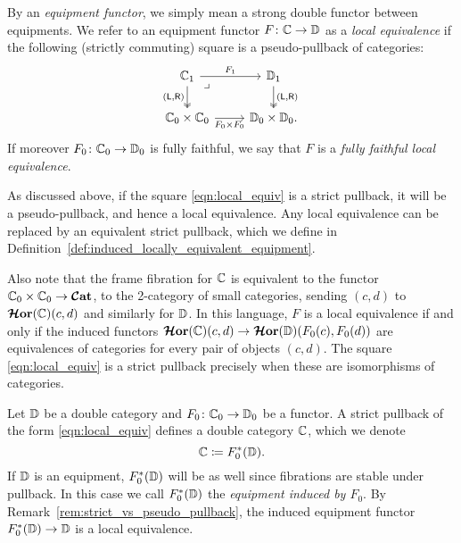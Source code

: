 \documentclass[11pt,oneside,article]{memoir}
\begin{document}
\begin{definition}
      \label{def:local_equivalence}
   By an \emph{equipment functor}, we simply mean a strong double functor between equipments. We refer to an equipment functor $F\colon\mathbb{C}\to\mathbb{D}$ as a \emph{local equivalence} if the following (strictly commuting) square is a pseudo-pullback of categories:
   \begin{equation} \begin{tikzcd}
         \label{eqn:local_equiv}
      \dcat{C}_1 \ar[r,"F_1"] \ar[d,two heads,"{(\lframe,\rframe)}"'] \ar[dr,phantom,"\lrcorner" very near start]
         & \dcat{D}_1 \ar[d,two heads,"{(\lframe,\rframe)}"] \\
      \dcat{C}_0\times\dcat{C}_0 \ar[r,"F_0\times F_0"']
         & \dcat{D}_0\times\dcat{D}_0.
   \end{tikzcd} \end{equation}
   If moreover $F_0\colon\mathbb{C}_0\to\mathbb{D}_0$ is fully faithful, we say that $F$ is a \emph{fully faithful local equivalence}.
\end{definition}

\begin{remark}
      \label{rem:strict_vs_pseudo_pullback}
   As discussed above, if the square \eqref{eqn:local_equiv} is a strict pullback, it will be a pseudo-pullback, and hence a local equivalence. Any local equivalence can be replaced by an equivalent strict pullback, which we define in Definition~\ref{def:induced_locally_equivalent_equipment}.

   Also note that the frame fibration for $\mathbb{C}$ is equivalent to the functor $\mathbb{C}_0\times\mathbb{C}_0\to\bm{\mathcal{C}}\mathbf{at}$, to the 2-category of small categories, sending $(c,d)$ to $\bm{\mathcal{H}}\mathbf{or}(\mathbb{C})(c,d)$ and similarly for $\mathbb{D}$. In this language, $F$ is a local equivalence if and only if the induced functors $\bm{\mathcal{H}}\mathbf{or}(\mathbb{C})(c,d)\to\bm{\mathcal{H}}\mathbf{or}(\mathbb{D})(F_0(c),F_0(d))$ are equivalences of categories for every pair of objects $(c,d)$. The square \eqref{eqn:local_equiv} is a strict pullback precisely when these are isomorphisms of categories.
\end{remark}

\begin{definition}
      \label{def:induced_locally_equivalent_equipment}
   Let $\mathbb{D}$ be a double category and $F_0\colon\mathbb{C}_0\to\mathbb{D}_0$ be a functor. A strict pullback of the form \eqref{eqn:local_equiv} defines a double category $\mathbb{C}$, which we denote
   \[
      \mathbb{C}\coloneqq F_0^*(\mathbb{D}).
   \]
   If $\mathbb{D}$ is an equipment, $F_0^*(\mathbb{D})$ will be as well since fibrations are stable under pullback. In this case we call $F_0^*(\mathbb{D})$ the \emph{equipment induced by $F_0$}. By Remark~\ref{rem:strict_vs_pseudo_pullback}, the induced equipment functor $F_0^*(\mathbb{D})\to\mathbb{D}$ is a local equivalence.
\end{definition}
\end{document}
